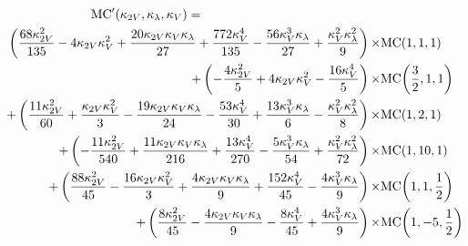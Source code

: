 {\begin{columns}
\begin{column}{0.8\textwidth}
{\begin{minipage}{1.0\textwidth}
            \vspace{10mm}
            {\tiny \begin{equation}
            \begin{split}
                \textrm{MC}'(\kvv, \kl, \kv) = \hspace{50mm}& \\
                \left(\frac{68 \kappa_{2V}^{2}}{135} - 4 \kappa_{2V} \kappa_{V}^{2} + \frac{20 \kappa_{2V} \kappa_{V} \kappa_{\lambda}}{27} + \frac{772 \kappa_{V}^{4}}{135} - \frac{56 \kappa_{V}^{3} \kappa_{\lambda}}{27} + \frac{\kappa_{V}^{2} \kappa_{\lambda}^{2}}{9}\right)
                    \times & \textrm{MC}{\left(1,1,1 \right)} \\
                + \left(- \frac{4 \kappa_{2V}^{2}}{5} + 4 \kappa_{2V} \kappa_{V}^{2} - \frac{16 \kappa_{V}^{4}}{5}\right)
                    \times & \textrm{MC}{\left(\frac{3}{2},1,1 \right)} \\
                + \left(\frac{11 \kappa_{2V}^{2}}{60} + \frac{\kappa_{2V} \kappa_{V}^{2}}{3} - \frac{19 \kappa_{2V} \kappa_{V} \kappa_{\lambda}}{24} - \frac{53 \kappa_{V}^{4}}{30} + \frac{13 \kappa_{V}^{3} \kappa_{\lambda}}{6} - \frac{\kappa_{V}^{2} \kappa_{\lambda}^{2}}{8}\right)
                    \times & \textrm{MC}{\left(1,2,1 \right)} \\
                + \left(- \frac{11 \kappa_{2V}^{2}}{540} + \frac{11 \kappa_{2V} \kappa_{V} \kappa_{\lambda}}{216} + \frac{13 \kappa_{V}^{4}}{270} - \frac{5 \kappa_{V}^{3} \kappa_{\lambda}}{54} + \frac{\kappa_{V}^{2} \kappa_{\lambda}^{2}}{72}\right)
                    \times & \textrm{MC}{\left(1,10,1 \right)}  \\
                + \left(\frac{88 \kappa_{2V}^{2}}{45} - \frac{16 \kappa_{2V} \kappa_{V}^{2}}{3} + \frac{4 \kappa_{2V} \kappa_{V} \kappa_{\lambda}}{9} + \frac{152 \kappa_{V}^{4}}{45} - \frac{4 \kappa_{V}^{3} \kappa_{\lambda}}{9}\right)
                    \times & \textrm{MC}{\left(1,1,\frac{1}{2} \right)} \\
                + \left(\frac{8 \kappa_{2V}^{2}}{45} - \frac{4 \kappa_{2V} \kappa_{V} \kappa_{\lambda}}{9} - \frac{8 \kappa_{V}^{4}}{45} + \frac{4 \kappa_{V}^{3} \kappa_{\lambda}}{9}\right)
                    \times & \textrm{MC}{\left(1,-5,\frac{1}{2} \right)}
                \nonumber
            \end{split} \end{equation}}

            \end{minipage}}
        \end{column}
    \end{columns}
}

